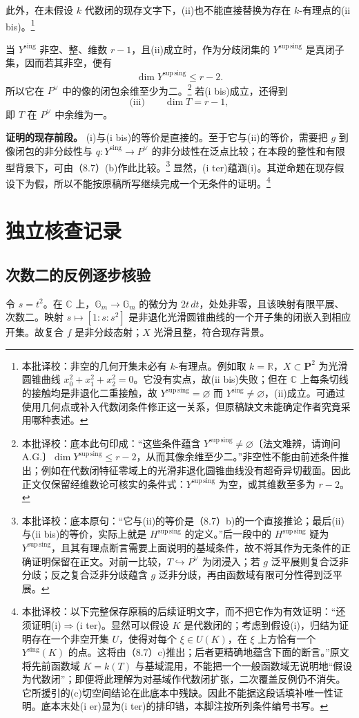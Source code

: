 \documentclass{ctexbook}
\newcommand{\corr}[1]{\footnote{本批译校：#1}}
\newcommand{\Ys}{Y^{\mathrm{sing}}}
\newcommand{\Yss}{Y^{\mathrm{sup\,sing}}}
\begin{document}
此外，在未假设 $k$ 代数闭的现存文字下，(ii)也不能直接替换为存在 $k$-有理点的(ii bis)。\corr{非空的几何开集未必有 $k$-有理点。例如取 $k=\mathbb R$，$X\subset\mathbf P^2$ 为光滑圆锥曲线 $x_0^2+x_1^2+x_2^2=0$。它没有实点，故(ii bis)失败；但在 $\mathbb C$ 上每条切线的接触均是非退化二重接触，故 $\Yss=\varnothing$ 而 $\Ys\ne\varnothing$，(ii)成立。可通过使用几何点或补入代数闭条件修正这一关系，但原稿缺文未能确定作者究竟采用哪种表述。}

当 $\Ys$ 非空、整、维数 $r-1$，且(ii)成立时，作为分歧闭集的 $\Yss$ 是真闭子集，因而若其非空，便有
\[
\dim\Yss\leq r-2.
\]
所以它在 $P^\vee$ 中的像的闭包余维至少为二。\corr{底本此句印成：“这些条件蕴含 $\Yss\ne\varnothing$〔法文难辨，请询问 A.G.〕$\dim\Yss\leq r-2$，从而其像余维至少二。”非空性不能由前述条件推出；例如在代数闭特征零域上的光滑非退化圆锥曲线没有超奇异切截面。因此正文仅保留经维数论可核实的条件式：$\Yss$ 为空，或其维数至多为 $r-2$。}
若(i bis)成立，还得到
\[
\text{(iii)}\qquad\dim T=r-1,
\]
即 $T$ 在 $P^\vee$ 中余维为一。

\bigskip
\noindent\textbf{证明的现存前段。}
(i)与(i bis)的等价是直接的。至于它与(ii)的等价，需要把 $g$ 到像闭包的非分歧性与 $q:\Ys\to P^\vee$ 的非分歧性在泛点比较；在本段的整性和有限型背景下，可由（8.7）(b)作此比较。\corr{底本原句：“它与(ii)的等价是（8.7）b)的一个直接推论；最后(ii)与(ii bis)的等价，实际上就是 $H^{\mathrm{sup\,sing}}$ 的定义。”后一段中的 $H^{\mathrm{sup\,sing}}$ 疑为 $Y^{\mathrm{sup\,sing}}$，且其有理点断言需要上面说明的基域条件，故不将其作为无条件的正确证明保留在正文。对前一比较，$T\hookrightarrow P^\vee$ 为闭浸入；若 $g$ 泛平展则复合泛非分歧；反之复合泛非分歧蕴含 $g$ 泛非分歧，再由函数域有限可分性得到泛平展。}
显然，(i ter)蕴涵(i)。其逆命题在现存假设下为假，所以不能按原稿所写继续完成一个无条件的证明。\corr{以下完整保存原稿的后续证明文字，而不把它作为有效证明：“还须证明(i)$\Rightarrow$(i ter)。显然可以假设 $K$ 是代数闭的；考虑到假设(i)，归结为证明存在一个非空开集 $U$，使得对每个 $\xi\in U(K)$，在 $\xi$ 上方恰有一个 $\Ys(K)$ 的点。这将由（8.7）c)推出；后者更精确地蕴含下面的断言。”原文将先前函数域 $K=k(T)$ 与基域混用，不能把一个一般函数域无说明地“假设为代数闭”；即便将此理解为对基域作代数闭扩张，二次覆盖反例仍不消失。它所援引的(c)切空间结论在此底本中残缺。因此不能据这段话填补唯一性证明。底本末处(i er)显为(i ter)的排印错，本脚注按所列条件编号书写。}

\backmatter
\chapter*{独立核查记录}
\section*{次数二的反例逐步核验}
令 $s=t^2$。在 $\mathbb C$ 上，$\mathbb G_m\to\mathbb G_m$ 的微分为 $2t\,dt$，处处非零，且该映射有限平展、次数二。映射 $s\mapsto[1:s:s^2]$ 是非退化光滑圆锥曲线的一个开子集的闭嵌入到相应开集。故复合 $f$ 是非分歧态射；$X$ 光滑且整，符合现存背景。
\end{document}
